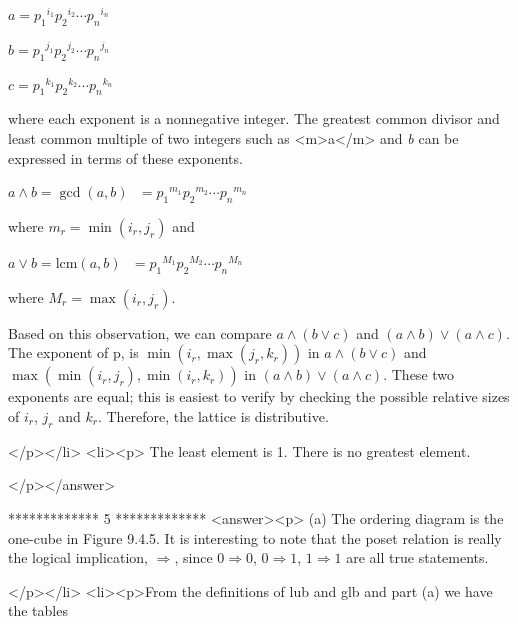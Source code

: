 \(a = p_1{}^{i_1}p_2{}^{i_2}\cdots  p_n{}^{i_n}\)



 \(b= p_1{}^{j_1}p_2{}^{j_2}\cdots  p_n{}^{j_n}\)



\(c= p_1{}^{k_1}p_2{}^{k_2}\cdots  p_n{}^{k_n}\)



where each exponent is a nonnegative integer. The greatest common divisor and least common multiple of two integers such as <m>a</m> and \textit{
b} can be expressed in terms of these exponents.



\(a \land  b = \gcd (a, b)\text{  }= p_1{}^{m_1}p_2{}^{m_2}\cdots  p_n{}^{m_n}\) 



where \(m_r=\min \left(i_r, j_r\right)\) and



\(a \lor  b = \text{lcm}(a, b)\text{  }= p_1{}^{M_1}p_2{}^{M_2}\cdots  p_n{}^{M_n}\) 



where \(M_r=\max \left(i_r, j_r\right)\).



Based on this observation, we can compare \(a \land  (b \lor  c )\) and \(( a\land b) \lor  (a \land c)\). The exponent of p, is \(\min \left(i_r,\max
\left(j_r, k_r \right)\right)\) in \(a \land  (b \lor  c )\) and \(\max \left(\min \left(i _r , j_r\right), \min \left(i_r , k _r \right)\right)\)
in \((a \land  b) \lor  (a \land  c)\). These two exponents are equal; this is easiest to verify by checking the possible relative sizes of \(i_r\),
\(j_r\) and \(k_r\).  Therefore, the lattice is distributive.

</p></li>
<li><p> The least element is 1. There is no greatest element.

</p></answer>


*************
5
*************
<answer><p> (a) The ordering diagram is the one-cube in Figure 9.4.5. It is interesting to note that the poset relation is really the logical implication,
\(\Rightarrow\),  since \(0\Rightarrow  0\),  \(0 \Rightarrow 1\), \(1 \Rightarrow  1\) are all true statements.

</p></li>
<li><p>From the definitions of lub and glb and part (a) we have the tables



